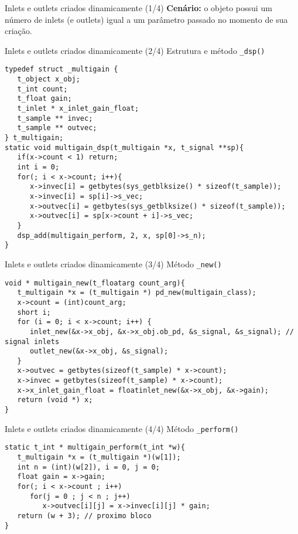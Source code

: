 \begin{frame}{Inlets e outlets criados dinamicamente (1/4)}
\textbf{Cenário:} o objeto possui um número de inlets (e outlets) igual a um parâmetro
passado no momento de sua criação. 
\end{frame}


\begin{frame}[fragile]{Inlets e outlets criados dinamicamente (2/4)}
{Estrutura e método \texttt{\_dsp()}}
\begin{lstlisting}
typedef struct _multigain {
   t_object x_obj;
   t_int count;
   t_float gain;
   t_inlet * x_inlet_gain_float;
   t_sample ** invec;
   t_sample ** outvec;
} t_multigain;
static void multigain_dsp(t_multigain *x, t_signal **sp){
   if(x->count < 1) return;
   int i = 0;
   for(; i < x->count; i++){
      x->invec[i] = getbytes(sys_getblksize() * sizeof(t_sample));
      x->invec[i] = sp[i]->s_vec;
      x->outvec[i] = getbytes(sys_getblksize() * sizeof(t_sample));
      x->outvec[i] = sp[x->count + i]->s_vec;
   }
   dsp_add(multigain_perform, 2, x, sp[0]->s_n);
}

\end{lstlisting}
\end{frame}


\begin{frame}[fragile]{Inlets e outlets criados dinamicamente (3/4)}
{Método \texttt{\_new()}}
\begin{lstlisting}
void * multigain_new(t_floatarg count_arg){
   t_multigain *x = (t_multigain *) pd_new(multigain_class);
   x->count = (int)count_arg;
   short i;
   for (i = 0; i < x->count; i++) {
      inlet_new(&x->x_obj, &x->x_obj.ob_pd, &s_signal, &s_signal); // signal inlets
      outlet_new(&x->x_obj, &s_signal);
   }
   x->outvec = getbytes(sizeof(t_sample) * x->count);
   x->invec = getbytes(sizeof(t_sample) * x->count);
   x->x_inlet_gain_float = floatinlet_new(&x->x_obj, &x->gain);
   return (void *) x;
}
\end{lstlisting}
\end{frame}


\begin{frame}[fragile]{Inlets e outlets criados dinamicamente (4/4)}
{Método \texttt{\_perform()}}
\begin{lstlisting}
static t_int * multigain_perform(t_int *w){
   t_multigain *x = (t_multigain *)(w[1]);
   int n = (int)(w[2]), i = 0, j = 0;
   float gain = x->gain;
   for(; i < x->count ; i++)
      for(j = 0 ; j < n ; j++)
         x->outvec[i][j] = x->invec[i][j] * gain;
   return (w + 3); // proximo bloco
}
\end{lstlisting}
\end{frame}

